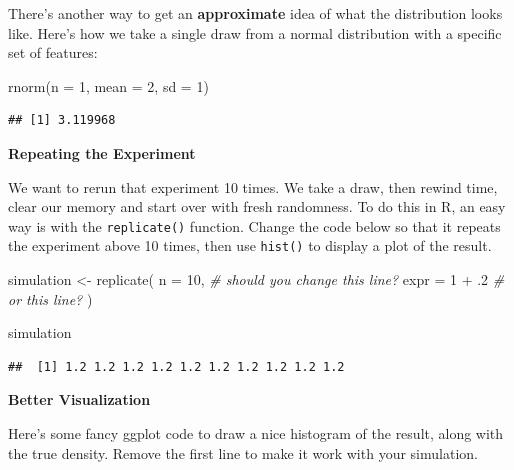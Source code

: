 \documentclass[
]{book}
\newenvironment{Shaded}{\begin{snugshade}}{\end{snugshade}}
\newcommand{\AttributeTok}[1]{\textcolor[rgb]{0.77,0.63,0.00}{#1}}
\newcommand{\CommentTok}[1]{\textcolor[rgb]{0.56,0.35,0.01}{\textit{#1}}}
\newcommand{\DecValTok}[1]{\textcolor[rgb]{0.00,0.00,0.81}{#1}}
\newcommand{\FunctionTok}[1]{\textcolor[rgb]{0.00,0.00,0.00}{#1}}
\newcommand{\NormalTok}[1]{#1}
\newcommand{\OtherTok}[1]{\textcolor[rgb]{0.56,0.35,0.01}{#1}}
\newcommand{\SpecialCharTok}[1]{\textcolor[rgb]{0.00,0.00,0.00}{#1}}
\theoremstyle{definition}
\theoremstyle{definition}
\theoremstyle{definition}
\theoremstyle{definition}
\theoremstyle{remark}
\begin{document}
There's another way to get an \textbf{approximate} idea of what the distribution looks like. Here's how we take a single draw from a normal distribution with a specific set of features:

\begin{Shaded}
\begin{Highlighting}[]
\FunctionTok{rnorm}\NormalTok{(}\AttributeTok{n =} \DecValTok{1}\NormalTok{, }\AttributeTok{mean =} \DecValTok{2}\NormalTok{, }\AttributeTok{sd =} \DecValTok{1}\NormalTok{)}
\end{Highlighting}
\end{Shaded}

\begin{verbatim}
## [1] 3.119968
\end{verbatim}

\textbf{Repeating the Experiment}

We want to rerun that experiment 10 times. We take a draw, then rewind time, clear our memory and start over with fresh randomness. To do this in R, an easy way is with the \texttt{replicate()} function. Change the code below so that it repeats the experiment above 10 times, then use \texttt{hist()} to display a plot of the result.

\begin{Shaded}
\begin{Highlighting}[]
\NormalTok{simulation }\OtherTok{\textless{}{-}} \FunctionTok{replicate}\NormalTok{(}
  \AttributeTok{n    =} \DecValTok{10}\NormalTok{,      }\CommentTok{\# should you change this line? }
  \AttributeTok{expr =} \DecValTok{1} \SpecialCharTok{+}\NormalTok{ .}\DecValTok{2}   \CommentTok{\# or this line? }
\NormalTok{  )}

\NormalTok{simulation}
\end{Highlighting}
\end{Shaded}

\begin{verbatim}
##  [1] 1.2 1.2 1.2 1.2 1.2 1.2 1.2 1.2 1.2 1.2
\end{verbatim}

\textbf{Better Visualization}

Here's some fancy ggplot code to draw a nice histogram of the result, along with the true density. Remove the first line to make it work with your simulation.
\end{document}
